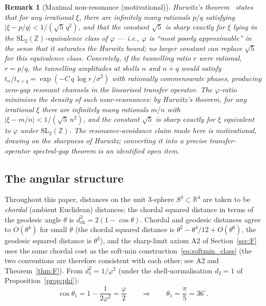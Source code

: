 \documentclass[12pt]{article}
\newtheorem{remark}[theorem]{Remark}
\newcommand{\phig}{\varphi}
\begin{document}
\begin{remark}[Maximal non-resonance (motivational)]\label{rem:hurwitz}
Hurwitz's theorem~\citep{Hurwitz1891} states that for any irrational $\xi$, there are \emph{infinitely many} rationals $p/q$ satisfying $|\xi - p/q| < 1/(\sqrt{5}\,q^2)$, and that the constant $\sqrt{5}$ is sharp exactly for $\xi$ lying in the $\mathrm{SL}_2(\mathbb Z)$-equivalence class of $\phig$ --- i.e., $\phig$ is ``most poorly approximable'' in the sense that it saturates the Hurwitz bound; no larger constant can replace $\sqrt{5}$ for this equivalence class. Concretely, if the tunnelling ratio $r$ were rational,
$r = p/q$, the tunnelling amplitudes at shells $n$ and $n{+}q$ would
satisfy $t_n/t_{n+q} = \exp(-C\,q\,\log r\,/\sigma^2)$ with rationally
commensurate phases, producing zero-gap resonant channels in the
linearised transfer operator. The $\phig$-ratio minimises the density of
such near-resonances: by Hurwitz's theorem, for any irrational $\xi$ there are infinitely many rationals $m/n$ with $|\xi - m/n| < 1/(\sqrt{5}\,n^2)$, and the constant $\sqrt{5}$ is sharp exactly for $\xi$ equivalent to $\phig$ under $\mathrm{SL}_2(\mathbb Z)$. The resonance-avoidance claim made here is \emph{motivational}, drawing on the sharpness of Hurwitz; converting it into a precise transfer-operator spectral-gap theorem is an identified open item.
\end{remark}

\subsection{The angular structure}

Throughout this paper, distances on the unit 3-sphere $S^3 \subset \mathbb{R}^4$ are taken to be \emph{chordal} (ambient Euclidean) distances; the chordal squared distance in terms of the geodesic angle $\theta$ is $d_{\mathrm{ch}}^2 = 2(1 - \cos\theta)$. Chordal and geodesic distances agree to $O(\theta^4)$ for small $\theta$ (the chordal squared distance is $\theta^2 - \theta^4/12 + O(\theta^6)$, the geodesic squared distance is $\theta^2$), and the sharp-limit axiom A2 of Section~\ref{sec:F} uses the same chordal cost as the soft-min construction~\eqref{eq:softmin_class} (the two conventions are therefore consistent with each other; see A2 and Theorem~\ref{thm:F}).
From $d_1^2 = 1/\phig^2$ (under the shell-normalisation $d_2 = 1$ of Proposition~\ref{prop:phi}):
\begin{equation}\label{eq:angle}
    \cos\theta_1 = 1 - \frac{1}{2\phig^2} = \frac{\phig}{2}
    \qquad\Longrightarrow\qquad
    \theta_1 = \frac{\pi}{5} = 36^\circ.
\end{equation}
\end{document}

